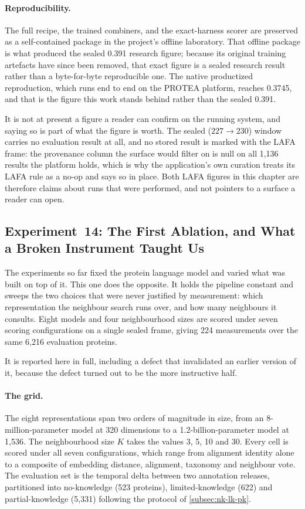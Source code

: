 \paragraph{Reproducibility.}
The full recipe, the trained combiners, and the exact-harness scorer are preserved
as a self-contained package in the project's offline laboratory. That offline
package is what produced the sealed 0.391 research figure; because its original
training artefacts have since been removed, that exact figure is a sealed research
result rather than a byte-for-byte reproducible one. The native productized
reproduction, which runs end to end on the PROTEA platform, reaches 0.3745, and
that is the figure this work stands behind rather than the sealed 0.391.

It is not at present a figure a reader can confirm on the running system, and
saying so is part of what the figure is worth. The sealed ($227 \to 230$) window
carries no evaluation result at all, and no stored result is marked with the
LAFA frame: the provenance column the surface would filter on is null on all
1{,}136 results the platform holds, which is why the application's own curation
treats its LAFA rule as a no-op and says so in place. Both LAFA figures in this
chapter are therefore claims about runs that were performed, and not pointers to
a surface a reader can open.


\subsection{Experiment~14: The First Ablation, and What a Broken Instrument Taught Us}
\label{subsec:exp14-first-plm-ablation}

The experiments so far fixed the protein language model and varied what was built
on top of it. This one does the opposite. It holds the pipeline constant and
sweeps the two choices that were never justified by measurement: which
representation the neighbour search runs over, and how many neighbours it
consults. Eight models and four neighbourhood sizes are scored under seven
scoring configurations on a single sealed frame, giving 224 measurements over the
same 6{,}216 evaluation proteins.

It is reported here in full, including a defect that invalidated an earlier
version of it, because the defect turned out to be the more instructive half.

\paragraph{The grid.}
The eight representations span two orders of magnitude in size, from an
8-million-parameter model at 320 dimensions to a 1.2-billion-parameter model at
1{,}536. The neighbourhood size $K$ takes the values 3, 5, 10 and 30. Every cell
is scored under all seven configurations, which range from alignment identity
alone to a composite of embedding distance, alignment, taxonomy and neighbour
vote. The evaluation set is the temporal delta between two annotation releases,
partitioned into no-knowledge (523 proteins), limited-knowledge (622) and
partial-knowledge (5{,}331) following the protocol of
\cref{subsec:nk-lk-pk}.

